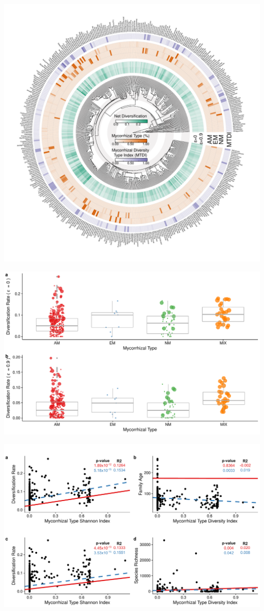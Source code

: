 \documentclass[12pt,]{article}
\begin{document}
\includegraphics{../output/tree_fig/phylo_genus_final_resized.pdf}

\newpage

\includegraphics{../output/figs/boxplots_netdiv_myctype.pdf}

\newpage

\includegraphics{../output/figs/scatterplots_lm_pgls_stem_edited.pdf}
\end{document}
